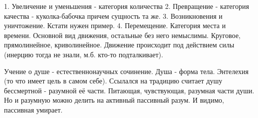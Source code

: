 	1. Увеличение и уменьшения - категория количества
	2. Превращение - категория качества - куколка-бабочка причем сущность та же.
	3. Возникновения и уничтожение. Кстати нужен пример.
	4. Перемещение. Категория места и времени. Основной вид движения, остальные без него немыслимы. Круговое, прямолинейное, криволинейное. Движение происходит под действием силы (инерцию тогда не знали, м.б. кто-то подталкивает).

Учение о душе - естественнонаучных сочинение. Душа - форма тела. Энтелехия (то что имеет цель в самом себе). Ссылался на традицию считает душу бессмертной - разумной её части. Питающая, чувствующая, разумная части души. Но и разумную можно делить на активный  пассивный разум. И видимо, пассивная умирает.
 